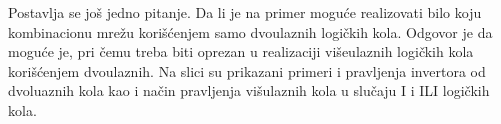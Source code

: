 \begin{frame}[label=02-s028]
\gusttekst
Postavlja se još jedno pitanje. Da li je na primer moguće realizovati bilo koju kombinacionu mrežu korišćenjem samo dvoulaznih logičkih kola. Odgovor je da moguće je, pri čemu treba biti oprezan u realizaciji višeulaznih logičkih kola korišćenjem dvoulaznih. Na slici su prikazani primeri i pravljenja invertora od dvoluaznih kola kao i način pravljenja višulaznih kola u slučaju I i ILI logičkih kola.

\centering
\par
\begingroup
\def\DEvrsta{and}\def\DEodnos{=}\def\DEkriticna{0}
\par
\def\DEvrsta{or}\def\DEkriticna{1}

\endgroup
\end{frame}
